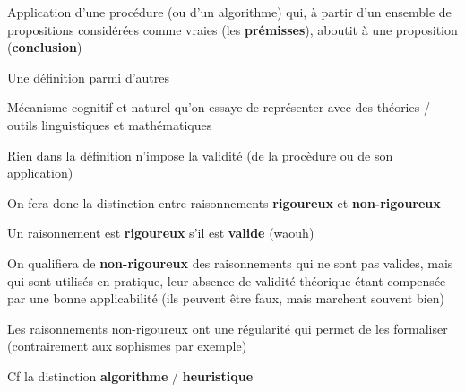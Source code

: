 


\begin{frame}
	
	\begin{description}[labelindent=6pt,style=multiline,leftmargin=1.3in]
		 \setlength\itemsep{1em}
		 \item[Raisonnement] Application d'une procédure \pause (ou d'un algorithme) \pause qui, à partir d'un ensemble de propositions considérées comme vraies (les \textbf{prémisses}), aboutit à une proposition (\textbf{conclusion})\pause
		 \item[Remarques] Une définition parmi d'autres\pause
		 \item[] Mécanisme cognitif et naturel \pause qu'on essaye de représenter avec des théories / outils linguistiques et mathématiques\pause
		 \item[] Rien dans la définition n'impose la validité (de la procèdure ou de son application)
 	\end{description}
\end{frame}



\begin{frame}
	On fera donc la distinction entre raisonnements \textbf{rigoureux} et \textbf{non-rigoureux} \pause \newline
	
	Un raisonnement est \textbf{rigoureux} s'il est \textbf{valide} \pause (waouh) \pause\newline

On qualifiera de \textbf{non-rigoureux} des raisonnements qui ne sont pas valides\pause, mais qui sont utilisés en pratique, leur absence de validité théorique étant compensée par une bonne applicabilité \pause (ils peuvent être faux, mais marchent souvent bien)\pause \newline

Les raisonnements non-rigoureux ont une régularité qui permet de les formaliser \pause (contrairement aux sophismes par exemple)\pause \newline

Cf la distinction \textbf{algorithme} / \textbf{heuristique}
		 \end{frame}




